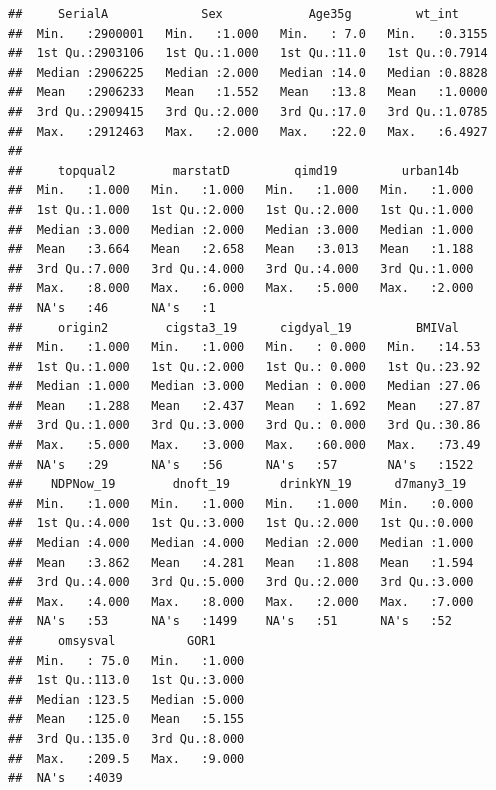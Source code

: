 \documentclass[
  11pt,
]{article}
\begin{document}
\begin{verbatim}
##     SerialA             Sex            Age35g         wt_int      
##  Min.   :2900001   Min.   :1.000   Min.   : 7.0   Min.   :0.3155  
##  1st Qu.:2903106   1st Qu.:1.000   1st Qu.:11.0   1st Qu.:0.7914  
##  Median :2906225   Median :2.000   Median :14.0   Median :0.8828  
##  Mean   :2906233   Mean   :1.552   Mean   :13.8   Mean   :1.0000  
##  3rd Qu.:2909415   3rd Qu.:2.000   3rd Qu.:17.0   3rd Qu.:1.0785  
##  Max.   :2912463   Max.   :2.000   Max.   :22.0   Max.   :6.4927  
##                                                                   
##     topqual2        marstatD         qimd19         urban14b    
##  Min.   :1.000   Min.   :1.000   Min.   :1.000   Min.   :1.000  
##  1st Qu.:1.000   1st Qu.:2.000   1st Qu.:2.000   1st Qu.:1.000  
##  Median :3.000   Median :2.000   Median :3.000   Median :1.000  
##  Mean   :3.664   Mean   :2.658   Mean   :3.013   Mean   :1.188  
##  3rd Qu.:7.000   3rd Qu.:4.000   3rd Qu.:4.000   3rd Qu.:1.000  
##  Max.   :8.000   Max.   :6.000   Max.   :5.000   Max.   :2.000  
##  NA's   :46      NA's   :1                                      
##     origin2        cigsta3_19      cigdyal_19         BMIVal     
##  Min.   :1.000   Min.   :1.000   Min.   : 0.000   Min.   :14.53  
##  1st Qu.:1.000   1st Qu.:2.000   1st Qu.: 0.000   1st Qu.:23.92  
##  Median :1.000   Median :3.000   Median : 0.000   Median :27.06  
##  Mean   :1.288   Mean   :2.437   Mean   : 1.692   Mean   :27.87  
##  3rd Qu.:1.000   3rd Qu.:3.000   3rd Qu.: 0.000   3rd Qu.:30.86  
##  Max.   :5.000   Max.   :3.000   Max.   :60.000   Max.   :73.49  
##  NA's   :29      NA's   :56      NA's   :57       NA's   :1522   
##    NDPNow_19        dnoft_19       drinkYN_19      d7many3_19   
##  Min.   :1.000   Min.   :1.000   Min.   :1.000   Min.   :0.000  
##  1st Qu.:4.000   1st Qu.:3.000   1st Qu.:2.000   1st Qu.:0.000  
##  Median :4.000   Median :4.000   Median :2.000   Median :1.000  
##  Mean   :3.862   Mean   :4.281   Mean   :1.808   Mean   :1.594  
##  3rd Qu.:4.000   3rd Qu.:5.000   3rd Qu.:2.000   3rd Qu.:3.000  
##  Max.   :4.000   Max.   :8.000   Max.   :2.000   Max.   :7.000  
##  NA's   :53      NA's   :1499    NA's   :51      NA's   :52     
##     omsysval          GOR1      
##  Min.   : 75.0   Min.   :1.000  
##  1st Qu.:113.0   1st Qu.:3.000  
##  Median :123.5   Median :5.000  
##  Mean   :125.0   Mean   :5.155  
##  3rd Qu.:135.0   3rd Qu.:8.000  
##  Max.   :209.5   Max.   :9.000  
##  NA's   :4039
\end{verbatim}
\end{document}
